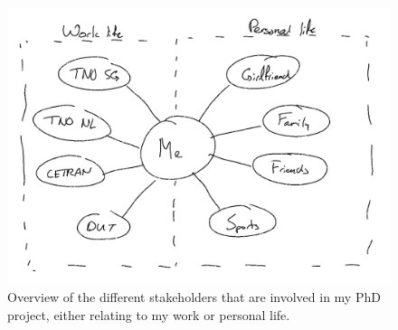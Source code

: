 \begin{figure}
	\centering
	\includegraphics[width=\linewidth]{figures/stakeholders}
	\caption{Overview of the different stakeholders that are involved in my PhD project, either relating to my work or personal life.}
	\label{fig:stakeholders} 
\end{figure}


